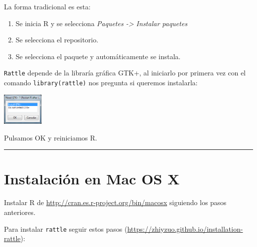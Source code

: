 \documentclass[
]{book}
\begin{document}
La forma tradicional es esta:

\begin{enumerate}
\def\labelenumi{\arabic{enumi}.}
\item
  Se inicia R y se selecciona \emph{Paquetes -\textgreater{} Instalar paquetes}
\item
  Se selecciona el repositorio.
\item
  Se selecciona el paquete y automáticamente se instala.
\end{enumerate}

\texttt{Rattle} depende de la libraría gráfica GTK+, al iniciarlo por primera vez
con el comando \texttt{library(rattle)} nos pregunta si queremos instalarla:

\includegraphics[width=0.15\textwidth,height=\textheight]{images/image7.png}

Pulsamos OK y reiniciamos R.

\begin{center}\rule{0.5\linewidth}{0.5pt}\end{center}

\section{Instalación en Mac OS X}\label{instalaciuxf3n-en-mac-os-x}

Instalar R de
\url{http://cran.es.r‐project.org/bin/macosx}
siguiendo los pasos anteriores.

Para instalar \texttt{rattle} seguir estos pasos (\url{https://zhiyzuo.github.io/installation-rattle}):
\end{document}
